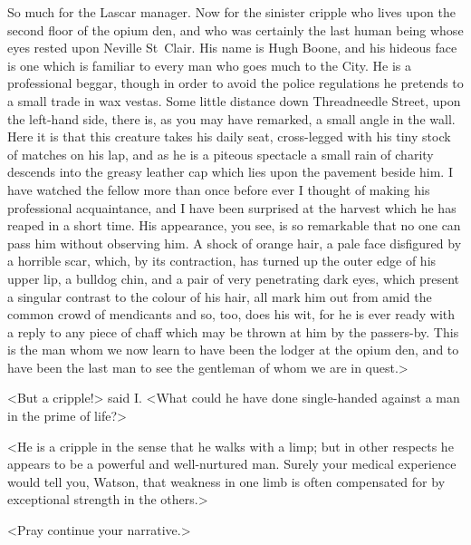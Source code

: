 So much for the Lascar manager. Now for the sinister cripple who lives upon the second floor of the opium den, and who was certainly the last human being whose eyes rested upon Neville St~Clair. His name is Hugh Boone, and his hideous face is one which is familiar to every man who goes much to the City. He is a professional beggar, though in order to avoid the police regulations he pretends to a small trade in wax vestas. Some little distance down Threadneedle Street, upon the left-hand side, there is, as you may have remarked, a small angle in the wall. Here it is that this creature takes his daily seat, cross-legged with his tiny stock of matches on his lap, and as he is a piteous spectacle a small rain of charity descends into the greasy leather cap which lies upon the pavement beside him. I have watched the fellow more than once before ever I thought of making his professional acquaintance, and I have been surprised at the harvest which he has reaped in a short time. His appearance, you see, is so remarkable that no one can pass him without observing him. A shock of orange hair, a pale face disfigured by a horrible scar, which, by its contraction, has turned up the outer edge of his upper lip, a bulldog chin, and a pair of very penetrating dark eyes, which present a singular contrast to the colour of his hair, all mark him out from amid the common crowd of mendicants and so, too, does his wit, for he is ever ready with a reply to any piece of chaff which may be thrown at him by the passers-by. This is the man whom we now learn to have been the lodger at the opium den, and to have been the last man to see the gentleman of whom we are in quest.>

<But a cripple!> said I\@. <What could he have done single-handed against a man in the prime of life?>

<He is a cripple in the sense that he walks with a limp; but in other respects he appears to be a powerful and well-nurtured man. Surely your medical experience would tell you, Watson, that weakness in one limb is often compensated for by exceptional strength in the others.>

<Pray continue your narrative.>

